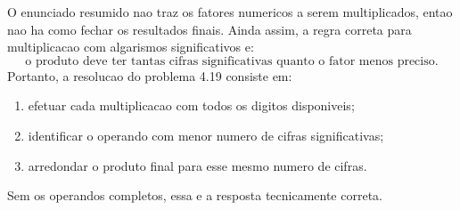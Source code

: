 O enunciado resumido nao traz os fatores numericos a serem multiplicados, entao nao ha como fechar os resultados finais. Ainda assim, a regra correta para multiplicacao com algarismos significativos e:
\[
\text{o produto deve ter tantas cifras significativas quanto o fator menos preciso.}
\]
Portanto, a resolucao do problema 4.19 consiste em:
\begin{enumerate}
\item efetuar cada multiplicacao com todos os digitos disponiveis;
\item identificar o operando com menor numero de cifras significativas;
\item arredondar o produto final para esse mesmo numero de cifras.
\end{enumerate}
Sem os operandos completos, essa e a resposta tecnicamente correta.

